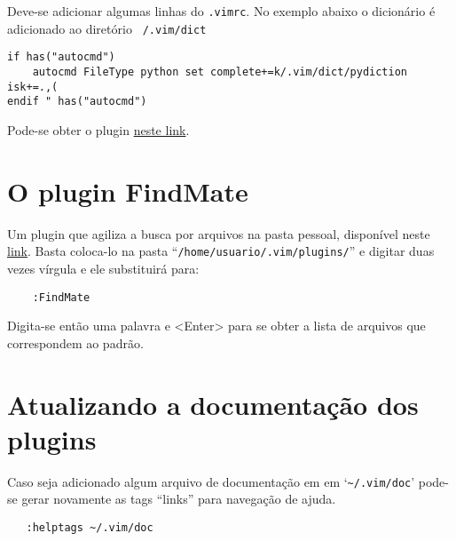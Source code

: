 Deve-se adicionar algumas linhas do {\tt .vimrc}.
No exemplo abaixo o dicionário é adicionado ao diretório {\tt ~/.vim/dict}
\begin{verbatim}
if has("autocmd")
    autocmd FileType python set complete+=k/.vim/dict/pydiction isk+=.,(
endif " has("autocmd") 
\end{verbatim}

Pode-se obter o plugin  \href{http://www.vim.org/scripts/script.php?script\_id=850}{neste link}.

\section{O plugin FindMate}
\label{sec:O plugin FindMate}

Um plugin que agiliza a busca por arquivos na pasta pessoal, disponível neste
 \href{http://snipt.net/voyeg3r/findmate-plugin-for-vim/}{link}. Basta
coloca-lo na pasta ``{\tt /home/usuario/.vim/plugins/}'' e digitar duas vezes
vírgula e ele substituirá para:

\begin{verbatim}
    :FindMate 
\end{verbatim}

Digita-se então uma palavra e <Enter> para se obter a lista de arquivos que
correspondem ao padrão.

\section{Atualizando a documentação dos plugins}
\label{sec:Atualizando a documentação dos plugins}

Caso seja adicionado algum arquivo de documentação em em `\verb+~/.vim/doc+' pode-se
gerar novamente as tags ``links'' para navegação de ajuda.

\begin{verbatim}
   :helptags ~/.vim/doc
\end{verbatim}
